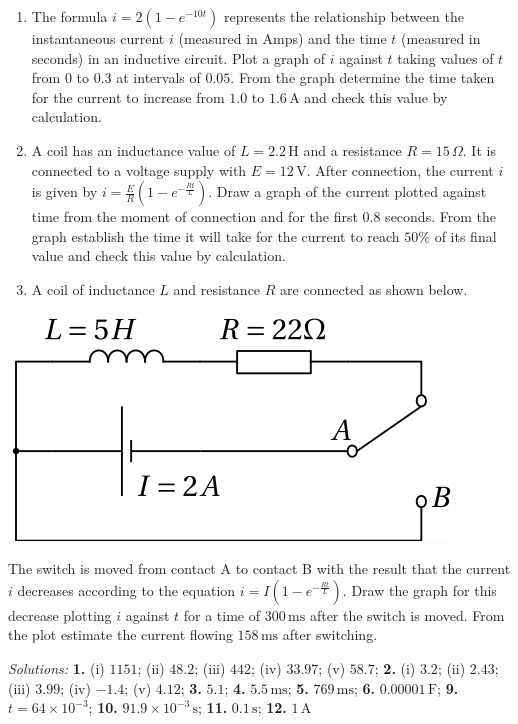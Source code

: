 \documentclass[
  12pt,
  oneside]{book}
\theoremstyle{definition}
\theoremstyle{definition}
\theoremstyle{definition}
\theoremstyle{definition}
\theoremstyle{remark}
\begin{document}
\begin{enumerate}
\item
  The formula \(i = 2(1 - e^{-10t})\) represents the relationship between the instantaneous current \(i\)
  (measured in Amps) and the time \(t\) (measured in seconds) in an inductive circuit. Plot a graph of \(i\)
  against \(t\) taking values of \(t\) from \(0\) to \(0.3\) at intervals of \(0.05\). From the graph determine the time
  taken for the current to increase from \(1.0\) to \(1.6\,\mathrm{A}\) and check this value by calculation.
\item
  A coil has an inductance value of \(L=2.2\,\mathrm{H}\) and a resistance \(R=15\,\Omega\). It is connected to a voltage supply with \(E=12\,\mathrm{V}\). After connection, the current \(i\) is given by \(i=\frac{E}{R}\left(1-e^{-\frac{Rt}{L}}\right)\).
  Draw a graph of the current plotted against time from the moment of connection and for the first \(0.8\) seconds. From the graph establish the time it will take for the current to reach \(50\%\) of its final value and check this value by calculation.
\item
  A coil of inductance \(L\) and resistance \(R\) are connected as shown below.
\end{enumerate}

\begin{center}\includegraphics{t07-circuit} \end{center}

The switch is moved from contact A to contact B with the result that the current \(i\) decreases according to the equation \(i=I\left(1-e^{-\frac{Rt}{L}}\right)\). Draw the graph for this decrease plotting \(i\) against \(t\) for a time of \(300\,\mathrm{ms}\) after the switch is moved. From the plot estimate the current flowing \(158\,\mathrm{ms}\) after switching.

\emph{Solutions:}
\textbf{1.} (i) \(1151\); (ii) \(48.2\); (iii) \(442\); (iv) \(33.97\); (v) \(58.7\);
\textbf{2.} (i) \(3.2\); (ii) \(2.43\); (iii) \(3.99\); (iv) \(-1.4\); (v) \(4.12\);
\textbf{3.} \(5.1\);
\textbf{4.} \(5.5\,\mathrm{ms}\);
\textbf{5.} \(769\,\mathrm{ms}\);
\textbf{6.} \(0.00001\,\mathrm{F}\);
\textbf{9.} \(t=64\times 10^{-3}\);
\textbf{10.} \(91.9\times 10^{-3}\,\mathrm{s}\);
\textbf{11.} \(0.1\,\mathrm{s}\);
\textbf{12.} \(1\,\mathrm{A}\)
\end{document}
